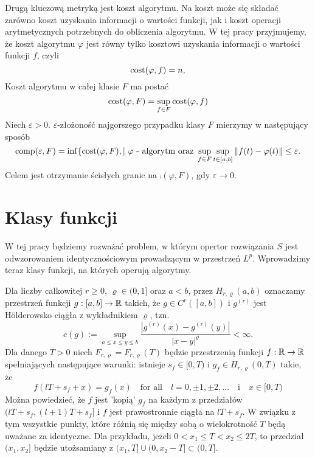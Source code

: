 \documentclass[oik, pdftex, robocza, man]{mgrwms}
\begin{document}
    Drugą kluczową metryką jest koszt algorytmu. Na koszt może się składać zarówno koszt uzyskania informacji o wartości funkcji, jak i koszt operacji arytmetycznych potrzebnych do obliczenia algorytmu. W tej pracy przyjmujemy, że koszt algorytmu $\varphi$ jest równy tylko kosztowi uzyskania informacji o wartości funkcji $f$, czyli
    \begin{equation*}
        \mathrm{cost}(\varphi, f) = n,
    \end{equation*}
    Koszt algorytmu w całej klasie $F$ ma postać
    \begin{equation*}
        \mathrm{cost}(\varphi, F) = \sup_{f \in F} \mathrm{cost}(\varphi, f)
    \end{equation*}
    Niech $\varepsilon > 0$. $\varepsilon$-złożoność najgorszego przypadku klasy $F$ mierzymy w następujący sposób
    \begin{equation*}
        \mathrm{comp}(\varepsilon, F) = \inf \{\mathrm{cost}(\varphi, F), | \text{ $\varphi$ - algorytm oraz } \sup_{f \in F} \sup_{t \in [a,b]} \|f(t) - \varphi(t)\| \leq \varepsilon.
    \end{equation*}
    Celem jest otrzymanie ścisłych granic na $\comp(\varphi, F)$, gdy $\varepsilon \rightarrow 0$.


\section{Klasy funkcji}

    W tej pracy będziemy rozważać problem, w którym opertor rozwiązania $S$ jest odwzorowaniem identycznościowym prowadzącym w przestrzeń $L^{p}$. Wprowadzimy teraz klasy funkcji, na których operują algorytmy.

    Dla liczby całkowitej $ r \geq 0$, $\varrho \in (0,1]$ oraz $a < b$, przez $H_{r, \varrho}(a,b)$ oznaczamy przestrzeń funkcji $g: [a,b] \rightarrow \mathbb{R}$ takich, że $g \in C^r([a, b])$ i $g^{(r)}$ jest Hölderowsko ciągła z wykładnikiem $\varrho$, tzn.
    \begin{equation*}
        c(g) := \sup_{a \leq x \leq y \leq b} \frac{|g^{(r)}(x) - g^{(r)}(y)|}{|x-y|^{\varrho}} < \infty.
    \end{equation*}
    Dla danego $T > 0$ niech $F_{r, \varrho} = F_{r, \varrho}(T)$ będzie przestrzenią funkcji $f: \mathbb{R} \rightarrow \mathbb{R}$ spełniających następujące warunki: istnieje $s_f \in [0, T)$ i $g_f \in H_{r, \varrho}(0,T)$ takie, że
    \begin{equation*}
        f(lT + s_f + x) = g_f(x) \quad \text{for all} \quad l = 0, \pm 1, \pm 2, \ldots \quad \text{i} \quad x \in [0, T)
    \end{equation*}
    Można powiedzieć, że $f$ jest 'kopią' $g_f$ na każdym z przedziałów $(lT + s_f, (l + 1)T + s_f]$ i $f$ jest prawostronnie ciągła na $lT + s_f$. W związku z tym wszystkie punkty, które różnią się między sobą o wielokrotność $T$ będą uważane za identyczne. Dla przykładu, jeżeli $0 < x_1 \leq T < x_2 \leq 2T$, to przedział $(x_1, x_2]$ będzie utożsamiany z $(x_1,T] \cup (0, x_2 - T] \subset (0, T]$.
\end{document}
